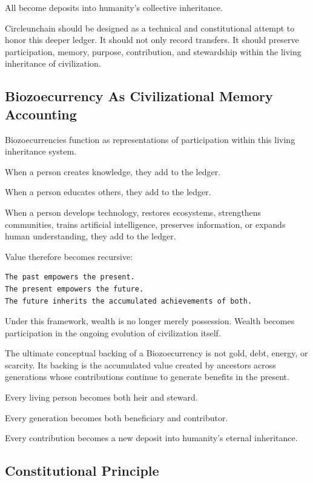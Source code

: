 ﻿\documentclass[12pt]{article}
\begin{document}
All become deposits into humanity's collective inheritance.

Circleunchain should be designed as a technical and constitutional attempt to honor this deeper ledger. It should not only record transfers. It should preserve participation, memory, purpose, contribution, and stewardship within the living inheritance of civilization.

\subsection{Biozoecurrency As Civilizational Memory Accounting}


Biozoecurrencies function as representations of participation within this living inheritance system.

When a person creates knowledge, they add to the ledger.

When a person educates others, they add to the ledger.

When a person develops technology, restores ecosystems, strengthens communities, trains artificial intelligence, preserves information, or expands human understanding, they add to the ledger.

Value therefore becomes recursive:

\begin{verbatim}
The past empowers the present.
The present empowers the future.
The future inherits the accumulated achievements of both.
\end{verbatim}

Under this framework, wealth is no longer merely possession. Wealth becomes participation in the ongoing evolution of civilization itself.

The ultimate conceptual backing of a Biozoecurrency is not gold, debt, energy, or scarcity. Its backing is the accumulated value created by ancestors across generations whose contributions continue to generate benefits in the present.

Every living person becomes both heir and steward.

Every generation becomes both beneficiary and contributor.

Every contribution becomes a new deposit into humanity's eternal inheritance.

\subsection{Constitutional Principle}
\end{document}
